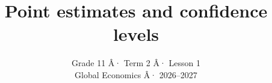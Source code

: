 \documentclass[12pt,aspectratio=169]{beamer}
\title{Point estimates and confidence levels}
\subtitle{Grade 11 Â· Term 2 Â· Lesson 1\\Global Economics Â· 2026--2027}
\author{}\date{}
\makeatletter
\renewcommand{\arraystretch}{1.22}
\newif\ifGTenHighlights
\newcommand{\GEHighlightMath}[2]{\tikz[baseline=(gehl.base)]
 \node[ge marker=\GECurrentRole](gehl){$\m@th#1#2$};}
\newcommand{\GEHighlight}[2]{\begingroup
 \def\GEOpacity{0}\ifGTenHighlights\def\GEOpacity{.32}\fi
 \def\GECurrentRole{#1}\ifmmode\mathpalette\GEHighlightMath{#2}
 \else\tikz[baseline=(gehl.base)]\node[ge marker=#1](gehl){#2};\fi\endgroup}
\newcommand{\GEPlain}[1]{{\GTenHighlightsfalse\GEHighlight{white}{#1}}}
\newcommand{\At}[3]{\ifnum#1=0\relax\GEPlain{#3}\else\alt<#1->{\GEHighlight{#2}{#3}}{\GEPlain{#3}}\fi}
\newcommand{\R}[2]{\leavevmode\visible<#1->{#2}}
\newcommand{\CtwoSD}[1]{\GEHighlight{PopulationSD}{#1}}
\newcommand{\CtwoSize}[1]{\GEHighlight{SampleSize}{#1}}
\newcommand{\CtwoConfidence}[1]{\GEHighlight{Confidence}{#1}}
\newcommand{\CtwoSignificance}[1]{\GEHighlight{Confidence}{#1}}
\newcommand{\CtwoCritical}[1]{\GEHighlight{Critical}{#1}}
\newcommand{\CtwoSE}[1]{\GEHighlight{StandardError}{#1}}
\newif\ifReference
\newcommand{\IR}[6]{\ifReference
 \At{\csname Input#1\endcsname}{#2}{$#3$}&\Words{\csname Input#1\endcsname}{#2}{#4}&\Words{\csname Input#1\endcsname}{#2}{#5}\\[1pt]
 \else
 \At{#1}{#2}{$#3$}&\Words{#1}{#2}{#4}&\R{#1}{\Words{#1}{#2}{#5}}\\[1pt]
 \fi}
\newcommand{\InfoTables}{\begingroup
\fontsize{9.5}{10}\selectfont\setlength{\parskip}{0pt}\setlength{\tabcolsep}{2pt}\renewcommand{\arraystretch}{1.0}\setlength{\aboverulesep}{.7pt}\setlength{\belowrulesep}{.7pt}\tikzset{ge marker/.append style={inner xsep=.25mm,inner ysep=.1mm}}
\begin{columns}[T,onlytextwidth]
\begin{column}{.63\textwidth}\begin{tabularx}{\linewidth}{@{}>{\raggedright\arraybackslash}p{.23\linewidth}>{\raggedright\arraybackslash}p{.38\linewidth}>{\raggedright\arraybackslash}X@{}}\toprule
\textbf{Symbol}&\textbf{Concept}&\textbf{In context...}\\\midrule
\multicolumn{3}{@{}l}{\textbf{Population parameters}}\\\midrule
\IR{2}{PopulationMean}{\mu}{Population mean}{Month's mean trip duration (minutes)}{}
\IR{3}{PopulationMean}{\mu_{\mathrm{known}}}{Later established population mean}{41 minutes}{}
\IR{4}{PopulationSD}{\sigma}{Population standard deviation}{14 minutes}{}
\multicolumn{3}{@{}l}{\textbf{Sample statistics}}\\\midrule
\IR{5}{SampleMean}{\bar{x}}{Sample mean}{40 minutes}{}
\IR{6}{SampleSize}{n}{Sample size}{49 trips}{}
\IR{7}{StandardError}{\mathrm{SE}}{Standard error}{2 minutes}{}
\end{tabularx}\end{column}
\begin{column}{.36\textwidth}\begin{tabularx}{\linewidth}{@{}>{\raggedright\arraybackslash}p{.23\linewidth}>{\raggedright\arraybackslash}p{.46\linewidth}>{\raggedright\arraybackslash}X@{}}\toprule
\textbf{Symbol}&\textbf{Concept}&\textbf{In context...}\\\midrule
\multicolumn{3}{@{}l}{\textbf{Procedure Settings}}\\\midrule
\IR{9}{Confidence}{C}{Confidence level}{95\% = 0.95}{}
\IR{11}{Confidence}{\alpha}{Significance level}{0.05}{}
\IR{13}{Confidence}{\alpha/2}{Tail area}{0.025}{}
\IR{15}{Critical}{z^*}{Critical value}{1.960}{}
\end{tabularx}\par\smallskip\ifReference\else \begin{overlayarea}{\linewidth}{1.15cm}\fontsize{9.5}{10}\selectfont
\only<7>{$\CtwoSE{\mathrm{SE}}=\dfrac{\CtwoSD{14}}{\sqrt{\CtwoSize{49}}}=\CtwoSE{2}$ minutes.}
\only<9>{$\CtwoConfidence{C}=\CtwoConfidence{95\%}=\CtwoConfidence{0.95}$.}
\only<11>{$\CtwoSignificance{\alpha}=1-\CtwoConfidence{0.95}=\CtwoSignificance{0.05}$.}
\only<13>{$\CtwoSignificance{\alpha}/2=\CtwoSignificance{0.05}/2=\CtwoSignificance{0.025}$.}
\only<15>{$\CtwoCritical{z^*}=\CtwoCritical{1.960}$: standard normal critical value for two-sided \CtwoConfidence{95\%} confidence.}
\end{overlayarea}\fi\end{column}
\end{columns}\endgroup}
\makeatother
\begin{document}
\newcommand{\TaskTwoTableStyle}{%
  \fontsize{9.5}{9.5}\selectfont\setlength{\parskip}{0pt}%
  \setlength{\tabcolsep}{2pt}\renewcommand{\arraystretch}{1.0}%
  \setlength{\aboverulesep}{0pt}\setlength{\belowrulesep}{0pt}%
  \tikzset{ge marker/.append style={inner xsep=.25mm,inner ysep=.1mm}}}
\newcommand{\TaskTwoInput}[5]{%
  \At{\csname Input#1\endcsname}{#2}{$#3$}\ \Words{\csname Input#1\endcsname}{#2}{#4}&%
  \Words{\csname Input#1\endcsname}{#2}{#5}\\[2pt]}
\newcommand{\TaskTwoReference}{%
  \begingroup\TaskTwoTableStyle
  \begin{tabularx}{\linewidth}{@{}>{\raggedright\arraybackslash}p{.61\linewidth}>{\raggedright\arraybackslash}X@{}}
  \toprule
  \textbf{Symbol / Concept}&\textbf{In context...}\\\midrule
  \multicolumn{2}{@{}l}{\textbf{Sample statistics}}\\\midrule
  \TaskTwoInput{5}{SampleMean}{\bar{x}}{Sample mean}{40 minutes}
  \TaskTwoInput{6}{SampleSize}{n}{Sample size}{49 trips}
  \TaskTwoInput{7}{StandardError}{\mathrm{SE}}{Standard error}{2 minutes}
  \midrule
  \multicolumn{2}{@{}l}{\textbf{Procedure Settings}}\\\midrule
  \TaskTwoInput{9}{Confidence}{C}{Confidence level}{95\% = 0.95}
  \TaskTwoInput{11}{Confidence}{\alpha}{Significance level}{0.05}
  \TaskTwoInput{13}{Confidence}{\alpha/2}{Tail area}{0.025}
  \TaskTwoInput{15}{Critical}{z^*}{Critical value}{1.960}
  \bottomrule
  \end{tabularx}\par\endgroup}
\newcommand{\TaskTwoLabel}[4]{\At{#1}{#2}{$#3$}\ \Words{#1}{#2}{#4}}
\end{document}
